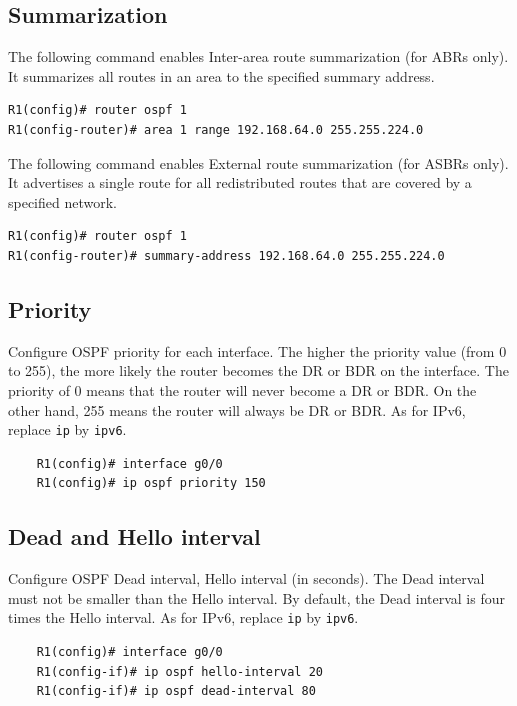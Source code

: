 \subsection{Summarization}

The following command enables Inter-area route summarization (for ABRs only). It summarizes all routes in an area to the specified summary address.

\begin{verbatim}
R1(config)# router ospf 1
R1(config-router)# area 1 range 192.168.64.0 255.255.224.0
\end{verbatim}

The following command enables External route summarization (for ASBRs only). It advertises a single route for all redistributed routes that are covered by a specified network.

\begin{verbatim}
R1(config)# router ospf 1
R1(config-router)# summary-address 192.168.64.0 255.255.224.0
\end{verbatim}

\subsection{Priority}

Configure OSPF priority for each interface. The higher the priority value (from 0 to 255), the more likely the router becomes the DR or BDR on the interface.	The priority of 0 means that the router will never  become a DR or BDR. On the other hand, 255 means the router will always be DR or BDR. As for IPv6, replace \verb|ip| by \verb|ipv6|.
	\begin{verbatim}
	R1(config)# interface g0/0 
	R1(config)# ip ospf priority 150
	\end{verbatim}
	
\subsection{Dead and Hello interval}

Configure OSPF Dead interval, Hello interval (in seconds). \note The Dead interval must not be smaller than the Hello interval. By default, the Dead interval is four times the Hello interval. As for IPv6, replace \verb|ip| by \verb|ipv6|.
	\begin{verbatim}
	R1(config)# interface g0/0
	R1(config-if)# ip ospf hello-interval 20 
	R1(config-if)# ip ospf dead-interval 80
	\end{verbatim}
	
